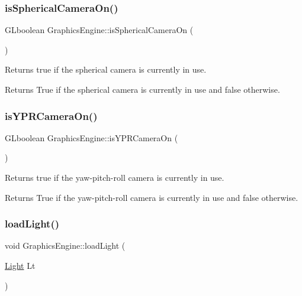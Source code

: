 \subsubsection{\texorpdfstring{is\+Spherical\+Camera\+On()}{isSphericalCameraOn()}}
{\footnotesize\ttfamily G\+Lboolean Graphics\+Engine\+::is\+Spherical\+Camera\+On (\begin{DoxyParamCaption}{ }\end{DoxyParamCaption})}



Returns true if the spherical camera is currently in use. 

\begin{DoxyReturn}{Returns}
True if the spherical camera is currently in use and false otherwise. 
\end{DoxyReturn}
\mbox{\label{class_graphics_engine_a8ed6b779b8696620241ba701afd6de67}} 
\subsubsection{\texorpdfstring{is\+Y\+P\+R\+Camera\+On()}{isYPRCameraOn()}}
{\footnotesize\ttfamily G\+Lboolean Graphics\+Engine\+::is\+Y\+P\+R\+Camera\+On (\begin{DoxyParamCaption}{ }\end{DoxyParamCaption})}



Returns true if the yaw-\/pitch-\/roll camera is currently in use. 

\begin{DoxyReturn}{Returns}
True if the yaw-\/pitch-\/roll camera is currently in use and false otherwise. 
\end{DoxyReturn}
\mbox{\label{class_graphics_engine_a687536e27a54ba4abc38db5630b5b2cb}} 
\subsubsection{\texorpdfstring{load\+Light()}{loadLight()}}
{\footnotesize\ttfamily void Graphics\+Engine\+::load\+Light (\begin{DoxyParamCaption}\item[{\hyperlink{class_light}{Light}}]{Lt }\end{DoxyParamCaption})}




